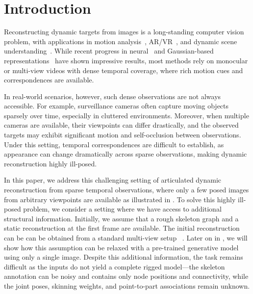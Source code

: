 \section{Introduction}
\label{dyn_sec:intro}

Reconstructing dynamic targets from images is a long-standing computer vision problem, with applications in motion analysis~\cite{liu2023building,chao2025part}, AR/VR~\cite{yan2025instant}, and dynamic scene understanding~\cite{wang2023root}. While recent progress in neural~\cite{pumarola2021d,cao2023hexplane,uzolas2023template} and Gaussian-based representations~\cite{Wu_2024_CVPR,wan2024template,huang2024sc,yao2025riggs} have shown impressive results, most methods rely on monocular or multi-view videos with dense temporal coverage, where rich motion cues and correspondences are available. 

In real-world scenarios, however, such dense observations are not always accessible. For example, surveillance cameras often capture moving objects sparsely over time, especially in cluttered environments.
Moreover, when multiple cameras are available, their viewpoints can differ drastically, and the observed targets may exhibit significant motion and self-occlusion between observations.
Under this setting, temporal correspondences are difficult to establish, as appearance can change dramatically across sparse observations, making dynamic reconstruction highly ill-posed.

In this paper, we address this challenging setting of articulated dynamic reconstruction from sparse temporal observations, where only a few posed images from arbitrary viewpoints are available as illustrated in .
To solve this highly ill-posed problem, we consider a setting where we have access to additional structural information. 
Initially, we assume that a rough skeleton graph and a static reconstruction at the first frame are available. 
The initial reconstruction can be can be obtained from a standard multi-view setup ~\cite{schoenberger2016sfm, schoenberger2016mvs, kerbl3Dgaussians}.
Later on in , we will show how this assumption can be relaxed with a pre-trained generative model~\cite{liu2023zero, shi2023mvdream, tang2023dreamgaussian} using only a single image. 
Despite this additional information, the task remains difficult as the inputs do not yield a complete rigged model---the skeleton annotation can be noisy and contains only node positions and connectivity, while the joint poses, skinning weights, and point-to-part associations remain unknown. 


